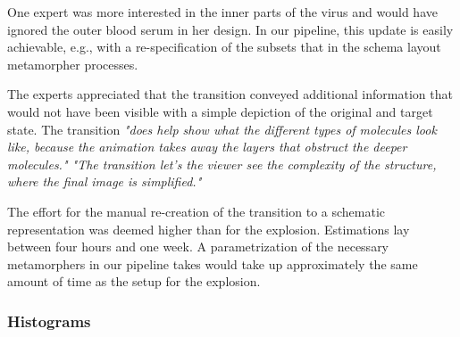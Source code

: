 One expert was more interested in the inner parts of the virus and would have ignored the outer blood serum in her design. In our pipeline, this update is easily achievable, e.g., with a re-specification of the subsets that in the schema layout metamorpher processes. 

The experts appreciated that the transition conveyed additional information that would not have been visible with a simple depiction of the original and target state.
The transition \textit{"does help show what the different types of molecules look like, because the animation takes away the layers that obstruct the deeper molecules."
"The transition let's the viewer see the complexity of the structure, where the final image is simplified."}








The effort for the manual re-creation of the transition to a schematic representation was deemed higher than for the explosion. Estimations lay between four hours and one week. A parametrization of the necessary metamorphers in our pipeline takes would take up approximately the same amount of time as the setup for the explosion.







\vspace{-5pt}

\subsubsection{Histograms}

